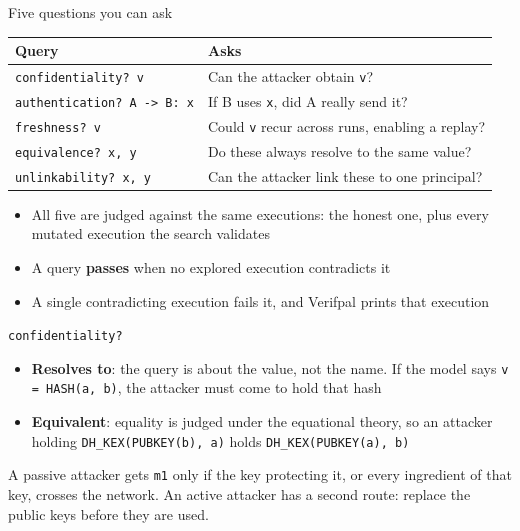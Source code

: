 \ifdefined\PRESENTATION\else\PassOptionsToClass{handout}{beamer}\fi\documentclass[aspectratio=169, lualatex]{beamer}
\begin{document}
\begin{frame}{Five questions you can ask}
	\begin{center}
		\small
		\begin{tabular}{|l|l|}
			\hline
			\textbf{Query}                     & \textbf{Asks}                                          \\
			\hline
			\texttt{confidentiality? v}        & Can the attacker obtain \texttt{v}?                    \\
			\hline
			\texttt{authentication? A -> B: x} & If B uses \texttt{x}, did A really send it?            \\
			\hline
			\texttt{freshness? v}              & Could \texttt{v} recur across runs, enabling a replay? \\
			\hline
			\texttt{equivalence? x, y}         & Do these always resolve to the same value?             \\
			\hline
			\texttt{unlinkability? x, y}       & Can the attacker link these to one principal?          \\
			\hline
		\end{tabular}
	\end{center}
	\vspace{0.7em}
	\begin{itemize}
		\item All five are judged against the same executions: the honest one, plus every mutated execution the search validates
		\item A query \textbf{passes} when no explored execution contradicts it
		\item A single contradicting execution fails it, and Verifpal prints that execution
	\end{itemize}
\end{frame}

\begin{frame}{\texttt{confidentiality?}}
	\vspace{0.5em}
	\begin{itemize}
		\item \textbf{Resolves to}: the query is about the value, not the name. If the model says \texttt{v = HASH(a, b)}, the attacker must come to hold that hash
		\item \textbf{Equivalent}: equality is judged under the equational theory, so an attacker holding \texttt{DH\_KEX(PUBKEY(b), a)} holds \texttt{DH\_KEX(PUBKEY(a), b)}
	\end{itemize}
	\vspace{0.5em}
	\begin{center}
		A passive attacker gets \texttt{m1} only if the key protecting it, or every ingredient of that key, crosses the network. An active attacker has a second route: replace the public keys before they are used.
	\end{center}
\end{frame}
\end{document}
